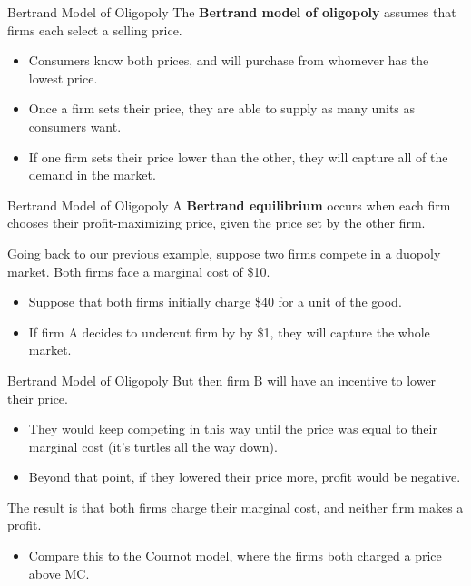 \documentclass{beamer}
\begin{document}
\begin{frame}{Bertrand Model of Oligopoly}
  The \textbf{Bertrand model of oligopoly} assumes that firms each select a selling price.

  \begin{itemize}
    \item Consumers know both prices, and will purchase from whomever has the lowest price.
    \item Once a firm sets their price, they are able to supply as many units as consumers want.
    \item If one firm sets their price lower than the other, they will capture all of the demand in the market.
  \end{itemize}
\end{frame}


\begin{frame}{Bertrand Model of Oligopoly}
  A \textbf{Bertrand equilibrium} occurs when each firm chooses their profit-maximizing price, given the price set by the other firm.

  \bigskip 
  Going back to our previous example, suppose two firms compete in a duopoly market. Both firms face a marginal cost of \$10.

  \begin{itemize}
    \item Suppose that both firms initially charge \$40 for a unit of the good.
    \item If firm A decides to undercut firm by by \$1, they will capture the whole market.
  \end{itemize}

\end{frame}


\begin{frame}{Bertrand Model of Oligopoly}
  But then firm B will have an incentive to lower their price.
  \begin{itemize}
    \item They would keep competing in this way until the price was equal to their marginal cost (it's turtles all the way down).
    \item Beyond that point, if they lowered their price more, profit would be negative.
  \end{itemize}

  \bigskip
  The result is that both firms charge their marginal cost, and neither firm makes a profit.

  \begin{itemize}
    \item Compare this to the Cournot model, where the firms both charged a price above MC.
  \end{itemize}
\end{frame}
\end{document}
